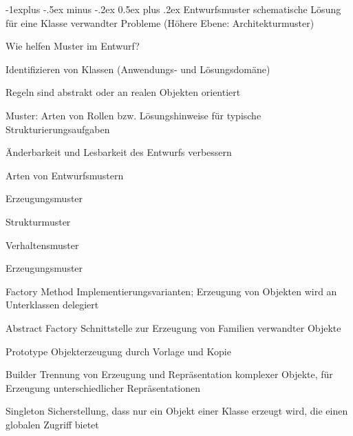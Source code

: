 \documentclass[a4paper]{article}
\makeatletter
\renewcommand{\subsection}{\@startsection{subsection}{2}{0mm}%
                                {-1explus -.5ex minus -.2ex}%
                                {0.5ex plus .2ex}%
                                {\normalfont\normalsize\bfseries}}
\makeatother
\begin{document}
\begin{multicols}{3}
  \subsection{Entwurfsmuster}
  schematische Lösung für eine Klasse verwandter Probleme (Höhere Ebene: Architekturmuster)
  \begin{itemize*}
    \item Wie helfen Muster im Entwurf?
    \begin{itemize*}
      \item Identifizieren von Klassen (Anwendungs- und Lösungsdomäne)
      \item Regeln sind abstrakt oder an realen Objekten orientiert
      \item Muster: Arten von Rollen bzw. Lösungshinweise für typische Strukturierungsaufgaben
      \item Änderbarkeit und Lesbarkeit des Entwurfs verbessern
    \end{itemize*}
    \item Arten von Entwurfsmustern
    \begin{itemize*}
      \item Erzeugungsmuster
      \item Strukturmuster
      \item Verhaltensmuster
    \end{itemize*}
    \item Erzeugungsmuster
    \begin{description*}
      \item[Factory Method] Implementierungsvarianten; Erzeugung von Objekten wird an Unterklassen delegiert
      \item[Abstract Factory] Schnittstelle zur Erzeugung von Familien verwandter Objekte
      \item[Prototype] Objekterzeugung durch Vorlage und Kopie
      \item[Builder] Trennung von Erzeugung und Repräsentation komplexer Objekte, für Erzeugung unterschiedlicher Repräsentationen
      \item[Singleton] Sicherstellung, dass nur ein Objekt einer Klasse erzeugt wird, die einen globalen Zugriff bietet
    \end{description*}
  \end{itemize*}


\end{multicols}
\end{document}
